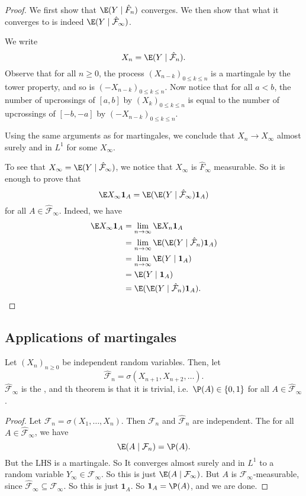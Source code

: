 \documentclass[a4paper]{article}
\begin{document}
\begin{proof}
  We first show that $\E(Y \mid \hat{F}_n)$ converges. We then show that what it converges to is indeed $\E(Y \mid \hat{\mathcal{F}}_\infty)$.

  We write
  \[
    X_n = \E(Y \mid \hat{\mathcal{F}}_n).
  \]
  Observe that for all $n \geq 0$, the process $(X_{n - k})_{0 \leq k \leq n}$ is a martingale by the tower property, and so is $(-X_{n - k})_{0 \leq k \leq n}$. Now notice that for all $a < b$, the number of upcrossings of $[a, b]$ by $(X_k)_{0 \leq k \leq n}$ is equal to the number of upcrossings of $[-b, -a]$ by $(-X_{n - k})_{0 \leq k \leq n}$.

  Using the same arguments as for martingales, we conclude that $X_n \to X_\infty$ almost surely and in $L^1$ for some $X_\infty$.

  To see that $X_\infty = \E(Y \mid \hat{\mathcal{F}}_\infty)$, we notice that $X_\infty$ is $\hat{F}_\infty$ measurable. So it is enough to prove that
  \[
    \E X_\infty \mathbf{1}_A = \E(\E(Y \mid \hat{\mathcal{F}}_\infty) \mathbf{1}_A)
  \]
  for all $A \in \hat{\mathcal{F}}_\infty$. Indeed, we have
  \begin{align*}
    \E X_\infty \mathbf{1}_A &= \lim_{n \to \infty} \E X_n \mathbf{1}_A\\
    &= \lim_{n\to \infty} \E(\E (Y \mid \hat{\mathcal{F}}_n) \mathbf{1}_A)\\
    &= \lim_{n \to \infty} \E(Y \mid \mathbf{1}_A)\\
    &= \E(Y \mid \mathbf{1}_A)\\
    &= \E(\E (Y \mid \hat{\mathcal{F}}_n) \mathbf{1}_A).\qedhere
  \end{align*}
\end{proof}

\subsection{Applications of martingales}
\begin{thm}
  Let $(X_n)_{n \geq 0}$ be independent random variables. Then, let
  \[
    \hat{\mathcal{F}}_n = \sigma (X_{n + 1}, X_{n + 2}, \ldots).
  \]
  $\hat{\mathcal{F}}_\infty$ is the , and th theorem is that it is trivial, i.e.\ $\P(A) \in \{0, 1\}$ for all $A \in \hat{\mathcal{F}}_\infty$.
\end{thm}

\begin{proof}
  Let $\mathcal{F}_n = \sigma(X_1, \ldots, X_n)$. Then $\mathcal{F}_n$ and $\hat{\mathcal{F}}_n$ are independent. The for all $A \in \hat{\mathcal{F}}_\infty$, we have
  \[
    \E(A \mid \mathcal{F}_n) = \P(A).
  \]
  But the LHS is a martingale. So It converges almost surely and in $L^1$ to a random variable $Y_\infty \in \mathcal{F}_\infty$. So this is just $\E(A \mid \mathcal{F}_\infty)$. But $A$ is $\mathcal{F}_\infty$-measurable, since $\hat{\mathcal{F}}_\infty \subseteq \mathcal{F}_\infty$. So this is just $\mathbf{1}_A$. So $\mathbf{1}_A = \P(A)$, and we are done.
\end{proof}
\end{document}
